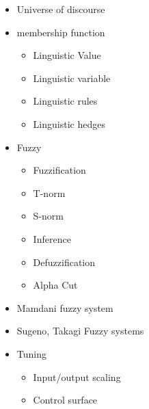 \documentclass[a4paper,11pt]{article}
\begin{document}
\begin{itemize}
\begin{itemize}
\begin{itemize}
                    \item Universe of discourse
                    \item membership function
                        \begin{itemize}
                            \item Linguistic Value
                            \item Linguistic variable
                            \item Linguistic rules
                            \item Linguistic hedges
                        \end{itemize}
                    \item Fuzzy
                        \begin{itemize}
                            \item Fuzzification 
                            \item T-norm
                            \item S-norm
                            \item Inference
                            \item Defuzzification
                            \item Alpha Cut
                                
                        \end{itemize}
                    \item Mamdani fuzzy system
                    \item Sugeno, Takagi Fuzzy systems
                    \item Tuning
                        \begin{itemize}
                            \item Input/output scaling
                            \item Control surface
                        \end{itemize}
                \end{itemize}
        \end{itemize}
        

\end{itemize}
\end{document}
